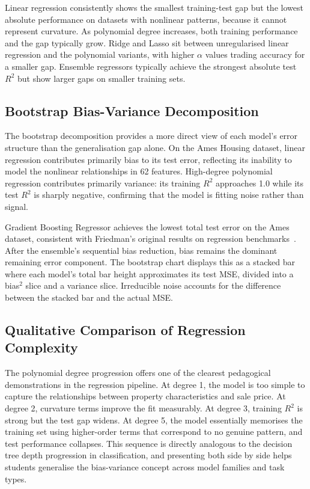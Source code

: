 \documentclass[conference]{IEEEtran}
\begin{document}
Linear regression consistently shows the smallest training-test gap but the lowest absolute performance on datasets with nonlinear patterns, because it cannot represent curvature. As polynomial degree increases, both training performance and the gap typically grow. Ridge and Lasso sit between unregularised linear regression and the polynomial variants, with higher $\alpha$ values trading accuracy for a smaller gap. Ensemble regressors typically achieve the strongest absolute test $R^2$ but show larger gaps on smaller training sets.

\subsection{Bootstrap Bias-Variance Decomposition}

The bootstrap decomposition provides a more direct view of each model's error structure than the generalisation gap alone. On the Ames Housing dataset, linear regression contributes primarily bias to its test error, reflecting its inability to model the nonlinear relationships in 62 features. High-degree polynomial regression contributes primarily variance: its training $R^2$ approaches 1.0 while its test $R^2$ is sharply negative, confirming that the model is fitting noise rather than signal.

Gradient Boosting Regressor achieves the lowest total test error on the Ames dataset, consistent with Friedman's original results on regression benchmarks~\cite{b13}. After the ensemble's sequential bias reduction, bias remains the dominant remaining error component. The bootstrap chart displays this as a stacked bar where each model's total bar height approximates its test MSE, divided into a bias$^2$ slice and a variance slice. Irreducible noise accounts for the difference between the stacked bar and the actual MSE.

\subsection{Qualitative Comparison of Regression Complexity}

The polynomial degree progression offers one of the clearest pedagogical demonstrations in the regression pipeline. At degree 1, the model is too simple to capture the relationships between property characteristics and sale price. At degree 2, curvature terms improve the fit measurably. At degree 3, training $R^2$ is strong but the test gap widens. At degree 5, the model essentially memorises the training set using higher-order terms that correspond to no genuine pattern, and test performance collapses. This sequence is directly analogous to the decision tree depth progression in classification, and presenting both side by side helps students generalise the bias-variance concept across model families and task types.
\end{document}
